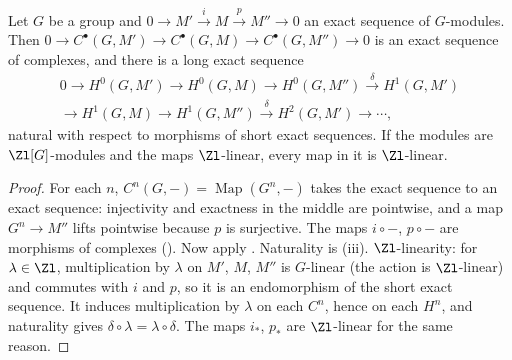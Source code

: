 \begin{proposition}\label{prop:cohomology:les-groups}
Let $G$ be a group and $0\to M'\xrightarrow{i}M\xrightarrow{p}M''\to0$ an exact sequence of $G$-modules. Then
$0\to C^\bullet(G,M')\to C^\bullet(G,M)\to C^\bullet(G,M'')\to0$ is an exact sequence of complexes, and there is a long exact sequence
\begin{multline*}
0\to H^0(G,M')\to H^0(G,M)\to H^0(G,M'')\xrightarrow{\delta}H^1(G,M')\\
\to H^1(G,M)\to H^1(G,M'')\xrightarrow{\delta}H^2(G,M')\to\cdots,
\end{multline*}
natural with respect to morphisms of short exact sequences. If the modules are $\Zl[G]$-modules and the maps $\Zl$-linear, every map in it is $\Zl$-linear.
\end{proposition}

\begin{proof}
For each $n$, $C^n(G,-)=\operatorname{Map}(G^n,-)$ takes the exact sequence to an exact sequence: injectivity and exactness in the middle are pointwise, and a
map $G^n\to M''$ lifts pointwise because $p$ is surjective. The maps $i\circ-$, $p\circ-$ are morphisms of complexes ().
Now apply . Naturality is (iii). $\Zl$-linearity: for $\lambda\in\Zl$, multiplication by $\lambda$ on $M'$, $M$,
$M''$ is $G$-linear (the action is $\Zl$-linear) and commutes with $i$ and $p$, so it is an endomorphism of the short exact sequence. It induces multiplication
by $\lambda$ on each $C^n$, hence on each $H^n$, and naturality gives $\delta\circ\lambda=\lambda\circ\delta$. The maps $i_*$, $p_*$ are $\Zl$-linear for the same reason.
\end{proof}

